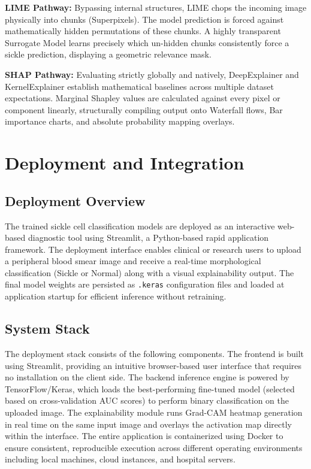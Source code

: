 \noindent\textbf{LIME Pathway:} Bypassing internal structures, LIME chops the incoming image physically into chunks (Superpixels). The model prediction is forced against mathematically hidden permutations of these chunks. A highly transparent Surrogate Model learns precisely which un-hidden chunks consistently force a sickle prediction, displaying a geometric relevance mask.

\noindent\textbf{SHAP Pathway:} Evaluating strictly globally and natively, DeepExplainer and KernelExplainer establish mathematical baselines across multiple dataset expectations. Marginal Shapley values are calculated against every pixel or component linearly, structurally compiling output onto Waterfall flows, Bar importance charts, and absolute probability mapping overlays.

\section{Deployment and Integration}

\subsection{Deployment Overview}

The trained sickle cell classification models are deployed as an interactive web-based diagnostic tool using Streamlit, a Python-based rapid application framework. The deployment interface enables clinical or research users to upload a peripheral blood smear image and receive a real-time morphological classification (Sickle or Normal) along with a visual explainability output. The final model weights are persisted as \texttt{.keras} configuration files and loaded at application startup for efficient inference without retraining.

\subsection{System Stack}

The deployment stack consists of the following components. The frontend is built using Streamlit, providing an intuitive browser-based user interface that requires no installation on the client side. The backend inference engine is powered by TensorFlow/Keras, which loads the best-performing fine-tuned model (selected based on cross-validation AUC scores) to perform binary classification on the uploaded image. The explainability module runs Grad-CAM heatmap generation in real time on the same input image and overlays the activation map directly within the interface. The entire application is containerized using Docker to ensure consistent, reproducible execution across different operating environments including local machines, cloud instances, and hospital servers.

